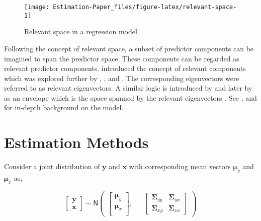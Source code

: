 \documentclass[12pt,3p,authoryear]{elsarticle}
\begin{document}
\begin{figure}

{\centering \texttt{[image: Estimation-Paper\_files/figure-latex/relevant-space-1]} 

}

\caption{Relevant space in a regression model}\label{fig:relevant-space}
\end{figure}

Following the concept of relevant space, a subset of predictor components can be imagined to span the predictor space. These components can be regarded as relevant predictor components. \citet{Naes1985} introduced the concept of relevant components which was explored further by \citet{helland1990partial}, \citet{naes1993relevant}, \citet{Helland1994b} and \citet{Helland2000}. The corresponding eigenvectors were referred to as relevant eigenvectors. A similar logic is introduced by \citet{cook2010envelope} and later by \citet{cook2013envelopes} as an envelope which is the space spanned by the relevant eigenvectors \citep[, p.101]{cook2018envelope}. See \citet{Rimal2018}, \citet{saebo2015simrel} and \citet{rimal2019pred} for in-depth background on the model.

\hypertarget{estimation-methods}{%
\section{Estimation Methods}\label{estimation-methods}}

Consider a joint distribution of \(\mathbf{y}\) and \(\mathbf{x}\) with corresponding mean vectors \(\boldsymbol{\mu}_y\) and \(\boldsymbol{\mu}_x\) as,

\begin{equation}
  \begin{bmatrix}
    \mathbf{y} \\ \mathbf{x}
  \end{bmatrix} 
  \sim \mathsf{N}
  \begin{pmatrix}
    \begin{bmatrix}
      \boldsymbol{\mu}_y \\
      \boldsymbol{\mu}_x \\
    \end{bmatrix}, &&
    \begin{bmatrix}
      \boldsymbol{\Sigma}_{yy} & \boldsymbol{\Sigma}_{yx} \\
      \boldsymbol{\Sigma}_{xy} & \boldsymbol{\Sigma}_{xx} 
    \end{bmatrix}
  \end{pmatrix}
  \label{eq:model-1}
\end{equation}
\end{document}
